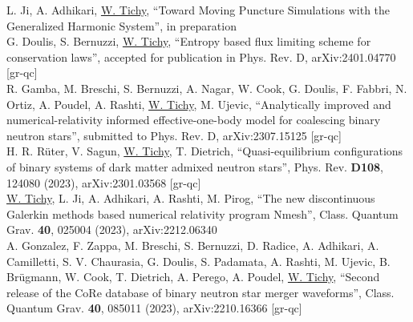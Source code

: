 
%
%

%


L. Ji, A. Adhikari, \underline{W. Tichy},
``Toward Moving Puncture Simulations with the Generalized Harmonic System'',
in preparation
\\

G. Doulis, S. Bernuzzi, \underline{W. Tichy},
``Entropy based flux limiting scheme for conservation laws'',
accepted for publication in Phys. Rev. D,
arXiv:2401.04770 [gr-qc]
\\

R. Gamba, M. Breschi, S. Bernuzzi, A. Nagar, W. Cook, G. Doulis, F. Fabbri,
N. Ortiz, A. Poudel, A. Rashti, \underline{W. Tichy}, M. Ujevic,
``Analytically improved and numerical-relativity informed effective-one-body
model for coalescing binary neutron stars'',
submitted to Phys. Rev. D,
arXiv:2307.15125 [gr-qc]
\\

H. R. Rüter, V. Sagun, \underline{W. Tichy}, T. Dietrich,
``Quasi-equilibrium configurations of binary systems of dark matter
admixed neutron stars'',
Phys. Rev. {\bf D108}, 124080 (2023),
arXiv:2301.03568 [gr-qc]
\\

\underline{W. Tichy}, L. Ji, A. Adhikari, A. Rashti, M. Pirog,
``The new discontinuous Galerkin methods based numerical relativity
program Nmesh'',
Class. Quantum Grav. {\bf 40}, 025004 (2023),
arXiv:2212.06340 %
\\

A. Gonzalez, F. Zappa, M. Breschi, S. Bernuzzi, D. Radice, A. Adhikari,
A. Camilletti, S. V. Chaurasia, G. Doulis, S. Padamata, A. Rashti,
M. Ujevic, B. Brügmann, W. Cook, T. Dietrich, A. Perego, A. Poudel,
\underline{W. Tichy},
``Second release of the CoRe database of binary neutron star merger
waveforms'',
Class. Quantum Grav. {\bf 40}, 085011 (2023),
arXiv:2210.16366 [gr-qc]
\\


